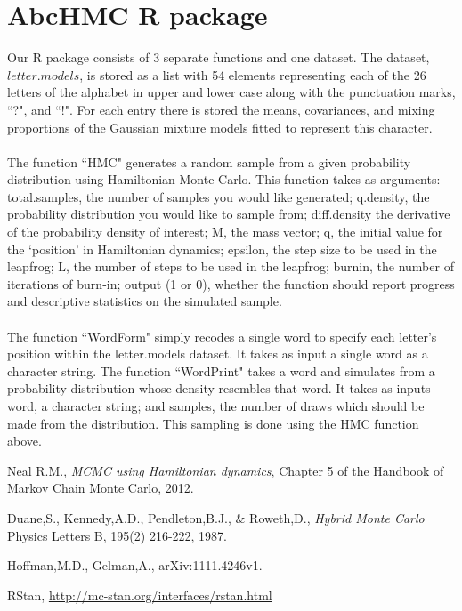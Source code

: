 \documentclass[11pt]{article}
\begin{document}
\section{AbcHMC R package}
\noindent Our R package consists of 3 separate functions and one dataset.
The dataset, $letter.models$, is stored as a list with 54 elements representing each of the 26 letters of the alphabet in upper and lower case along with the punctuation marks, ``?", and ``!". For each entry there is stored the means, covariances, and mixing proportions of the Gaussian mixture models fitted to represent this character.
\\
\\
The function ``HMC" generates a random sample from a given probability distribution using Hamiltonian Monte Carlo. This function takes as arguments: total.samples, the number of samples you would like generated; q.density, the probability distribution you would like to sample from; diff.density the derivative of the probability density of interest; M, the mass vector; q, the initial value for the `position' in Hamiltonian dynamics; epsilon, the step size to be used in the leapfrog; L, the number of steps to be used in the leapfrog; burnin, the number of iterations of burn-in; output (1 or 0), whether the function should report progress and descriptive statistics on the simulated sample.
\\
\\
The function ``WordForm" simply recodes a single word to specify each letter's position within the letter.models dataset. It takes as input a single word as a character string.
The function ``WordPrint" takes a word and simulates from a probability distribution whose density resembles that word. It takes as inputs word, a character string; and samples, the number of draws which should be made from the distribution. This sampling is done using the HMC function above.
\pagebreak
\begin{thebibliography}{9}

  Neal R.M.,
  \emph{MCMC using Hamiltonian dynamics},
  Chapter 5 of the Handbook of Markov Chain Monte Carlo,
  2012.
  
  Duane,S., Kennedy,A.D., Pendleton,B.J., \& Roweth,D.,
  \emph{Hybrid Monte Carlo }
  Physics Letters B, 195(2) 216-222, 1987.

  Hoffman,M.D., Gelman,A.,
  arXiv:1111.4246v1.
  
  RStan, \url{http://mc-stan.org/interfaces/rstan.html}

\end{thebibliography}
\end{document}
